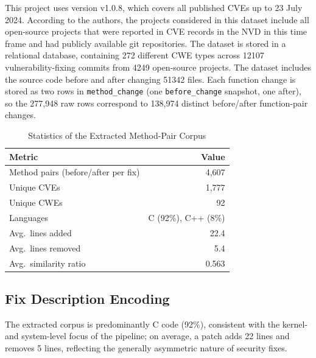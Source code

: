 This project uses version v1.0.8, which covers all published CVEs up to 23 July 2024. According to the authors, the projects considered in this dataset include all open-source projects that were reported in CVE records in the NVD in this time frame and had publicly available git repositories. The dataset is stored in a relational database, containing 272 different CWE types across 12107 vulnerability-fixing commits from 4249 open-source projects. The dataset includes the source code before and after changing 51342 files. Each function change is stored as two rows in \texttt{method\_change} (one \texttt{before\_change} snapshot, one after), so the 277,948 raw rows correspond to 138,974 distinct before/after function-pair changes.

\begin{table}[htbp]
\centering
\caption{Statistics of the Extracted Method-Pair Corpus}
\label{tab:cvefixes_extracted_stats}
\begin{tabular}{lr}
    \toprule
    \textbf{Metric} & \textbf{Value} \\
    \midrule
    Method pairs (before/after per fix) & 4,607 \\
    Unique CVEs & 1,777 \\
    Unique CWEs & 92 \\
    Languages & C (92\%), C++ (8\%) \\
    \midrule
    Avg.\ lines added & 22.4 \\
    Avg.\ lines removed & 5.4 \\
    Avg.\ similarity ratio & 0.563 \\
    \bottomrule
\end{tabular}
\end{table}

\subsection{Fix Description Encoding}
 
The extracted corpus is predominantly C code (92\%), consistent with the kernel- and
system-level focus of the pipeline; on average, a patch adds 22 lines and
removes 5 lines, reflecting the generally asymmetric nature of security
fixes.

